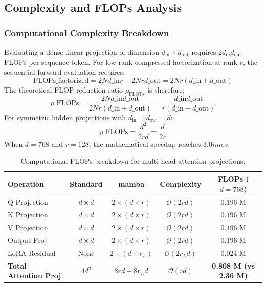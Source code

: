 \subsection{Complexity and FLOPs Analysis}
\subsubsection{Computational Complexity Breakdown}
Evaluating a dense linear projection of dimension $d_{\text{in}} \times d_{\text{out}}$ requires $2 d_{\text{in}} d_{\text{out}}$ FLOPs per sequence token. For low-rank compressed factorization at rank $r$, the sequential forward evaluation requires:
\[
\text{FLOPs}\_{\text{factorized}} = 2 N d\_{\text{in}} r + 2 N r d\_{\text{out}} = 2 N r (d\_{\text{in}} + d\_{\text{out}})
\]
The theoretical FLOP reduction ratio $\rho_{\text{FLOPs}}$ is therefore:
\[
\rho\_{\text{FLOPs}} = \frac{2 N d\_{\text{in}} d\_{\text{out}}}{2 N r (d\_{\text{in}} + d\_{\text{out}})} = \frac{d\_{\text{in}} d\_{\text{out}}}{r (d\_{\text{in}} + d\_{\text{out}})}
\]
For symmetric hidden projections with $d_{\text{in}} = d_{\text{out}} = d$:
\[
\rho\_{\text{FLOPs}} = \frac{d^2}{2 r d} = \frac{d}{2 r}
\]
When $d = 768$ and $r = 128$, the mathematical speedup reaches $3.0	imes$.

\begin{table}[H]
\centering
\small
\begin{tabular}{lcccc}
\toprule
\textbf{Operation} & \textbf{Standard} & \textbf{mamba} & \textbf{Complexity} & \textbf{FLOPs ($d=768$)} \\
\midrule
Q Projection & $d \times d$ & $2 \times (d \times r)$ & $\mathcal{O}(2rd)$ & $0.196$ M \\
K Projection & $d \times d$ & $2 \times (d \times r)$ & $\mathcal{O}(2rd)$ & $0.196$ M \\
V Projection & $d \times d$ & $2 \times (d \times r)$ & $\mathcal{O}(2rd)$ & $0.196$ M \\
Output Proj & $d \times d$ & $2 \times (d \times r)$ & $\mathcal{O}(2rd)$ & $0.196$ M \\
LoRA Residual & None & $2 \times (d \times r_L)$ & $\mathcal{O}(2r_L d)$ & $0.024$ M \\
\midrule
\textbf{Total Attention Proj} & $4 d^2$ & $8rd + 8r_L d$ & $\mathcal{O}(rd)$ & \textbf{0.808 M (vs 2.36 M)} \\
\bottomrule
\end{tabular}
\caption{Computational FLOPs breakdown for multi-head attention projections.}
\end{table}

